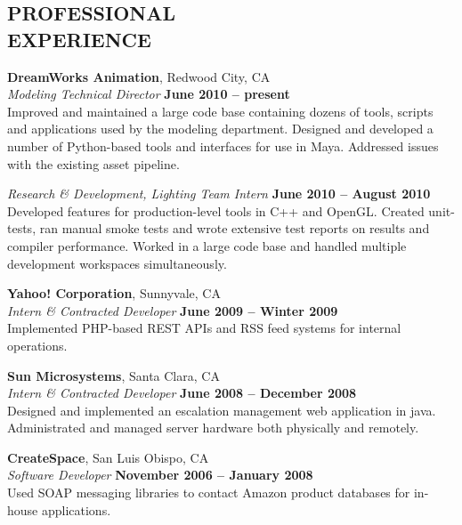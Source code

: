 \documentclass[margin,line]{resume}
\begin{document}
\begin{resume}
    \section{\mysidestyle \textbf{\large{P}\small{ROFESSIONAL\\EXPERIENCE}}}

    \textbf{\listing DreamWorks Animation}, Redwood City, CA \vspace{2mm}\\\vspace{1mm}%
    \textsl{Modeling Technical Director} \hfill \textbf{June 2010 -- present}\\
    Improved and maintained a large code base containing dozens of tools, scripts and applications used by the modeling department.
    Designed and developed a number of Python-based tools and interfaces for use in Maya.  Addressed issues with the existing asset pipeline. \vspace{1mm}

    \textsl{Research \& Development, Lighting Team Intern} \vspace{2mm}\hfill \textbf{June 2010 -- August 2010}\\
    Developed features for production-level tools in C++ and OpenGL.
    Created unit-tests, ran manual smoke tests and wrote extensive test reports on results and compiler performance.
    Worked in a large code base and handled multiple development workspaces simultaneously.

    \textbf{\listing Yahoo! Corporation}, Sunnyvale, CA \vspace{2mm}\\\vspace{1mm}%
    \textsl{Intern \& Contracted Developer} \hfill \textbf{June 2009 -- Winter 2009}\\
    Implemented PHP-based REST APIs and RSS feed systems for internal operations.

    \textbf{\listing Sun Microsystems}, Santa Clara, CA \vspace{2mm}\\\vspace{1mm}%
    \textsl{Intern \& Contracted Developer} \hfill \textbf{June 2008 -- December 2008}\\
    Designed and implemented an escalation management web application in java.
    Administrated and managed server hardware both physically and remotely.

    \textbf{\listing CreateSpace}, San Luis Obispo, CA \vspace{2mm}\\\vspace{1mm}%
    \textsl{Software Developer} \hfill \textbf{November 2006 -- January 2008}\\
    Used SOAP messaging libraries to contact Amazon product databases for in-house applications.
    


\end{resume}
\end{document}
